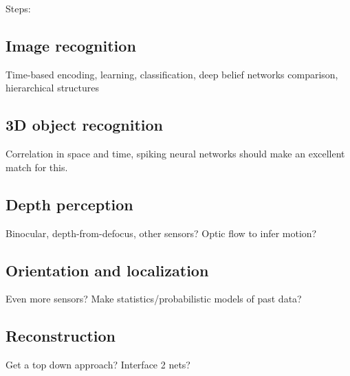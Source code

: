 Steps:
\subsection{Image recognition}
\label{subsec:intro:plan:2D-recognition}
Time-based encoding, learning, classification, deep belief networks comparison, hierarchical structures

\subsection{3D object recognition}
\label{subsec:intro:plan:3D-recognition}
Correlation in space and time, spiking neural networks should make an excellent match for this.

\subsection{Depth perception}
\label{subsec:intro:plan:depth-perception}
Binocular, depth-from-defocus, other sensors? Optic flow to infer motion?

\subsection{Orientation and localization}
\label{subsec:intro:plan:localization}
Even more sensors? Make statistics/probabilistic models of past data?

\subsection{Reconstruction}
\label{subsec:intro:plan:reconstruction}
Get a top down approach? Interface 2 nets?